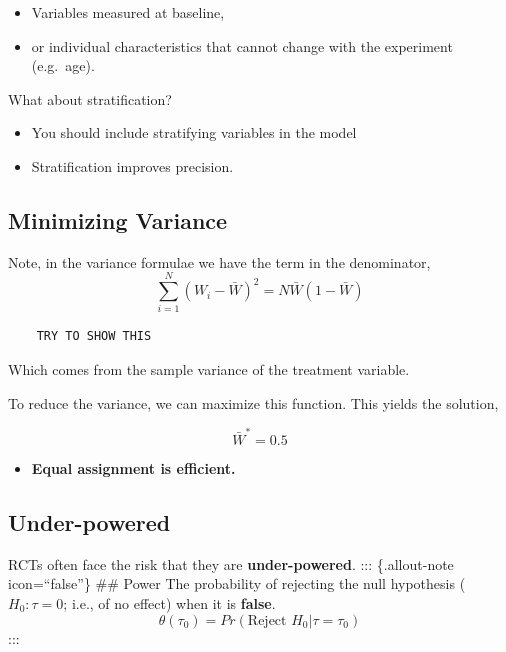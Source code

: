 \documentclass[
  letterpaper,
  DIV=11,
  numbers=noendperiod]{scrreprt}
\providecommand{\tightlist}{%
  \setlength{\itemsep}{0pt}\setlength{\parskip}{0pt}}\usepackage{longtable,booktabs,array}
\theoremstyle{definition}
\theoremstyle{remark}
\begin{document}
\begin{itemize}
\tightlist
\item
  Variables measured at baseline,
\item
  or individual characteristics that cannot change with the experiment
  (e.g.~age).
\end{itemize}

What about stratification?

\par

\begin{itemize}
\tightlist
\item
  You should include stratifying variables in the model
\item
  Stratification improves precision.
\end{itemize}

\hypertarget{minimizing-variance}{%
\subsection{Minimizing Variance}\label{minimizing-variance}}

Note, in the variance formulae we have the term in the denominator, \[
            \sum_{i=1}^N(W_i-\bar{W})^2 = N\bar{W}(1-\bar{W})
\]

\begin{verbatim}
    TRY TO SHOW THIS
\end{verbatim}

Which comes from the sample variance of the treatment variable.

\par

To reduce the variance, we can maximize this function. This yields the
solution,

\[
        \bar{W}^*=0.5
\]

\begin{itemize}
\tightlist
\item
  \textbf{Equal assignment is efficient.}
\end{itemize}

\hypertarget{under-powered}{%
\subsection{Under-powered}\label{under-powered}}

RCTs often face the risk that they are \textbf{under-powered}. :::
\{.allout-note icon=``false''\} \#\# Power The probability of rejecting
the null hypothesis (\(H_0: \tau=0\); i.e., of no effect) when it is
\textbf{false}. \[
                \theta(\tau_0)=Pr(\text{Reject }H_0|\tau=\tau_0)
\] :::
\end{document}
